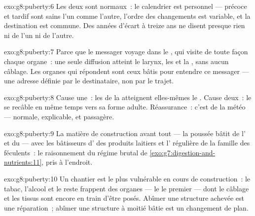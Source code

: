 \begin{solution}{exo:g8:puberty:6}
Les deux sont normaux~: le calendrier est personnel --- précoce et
tardif sont sains l'un comme l'autre, l'ordre des changements est
variable, et la destination est commune. Des années d'écart à treize
ans ne disent presque rien ni de l'un ni de l'autre.
\end{solution}

\begin{solution}{exo:g8:puberty:7}
Parce que le messager voyage dans le , qui visite de toute façon
chaque organe~: une seule diffusion atteint le larynx, les 
et la , sans aucun câblage. Les organes qui répondent sont ceux
bâtis pour entendre ce messager --- une adresse définie par le
destinataire, non par le trajet.
\end{solution}

\begin{solution}{exo:g8:puberty:8}
Cause une~: les  de la  atteignent elles-mêmes le
. Cause deux~: le  se recâble en même temps vers sa
forme adulte. Réassurance~: c'est de la météo --- normale,
explicable, et passagère.
\end{solution}

\begin{solution}{exo:g8:puberty:9}
La matière de construction avant tout --- la poussée bâtit de l'
et du  --- avec les bâtisseurs d' des produits laitiers et
l' régulière de la famille des féculents~: le raisonnement du
régime brutal de \cref{exo:g7:digestion-and-nutrients:11}, pris à
l'endroit.
\end{solution}

\begin{solution}{exo:g8:puberty:10}
Un chantier est le plus vulnérable en cours de construction~: le
tabac, l'alcool et le reste frappent des organes --- le  le
premier --- dont le câblage et les tissus sont encore en train
d'être posés. Abîmer une structure achevée est une réparation~;
abîmer une structure à moitié bâtie est un changement de plan.
\end{solution}

